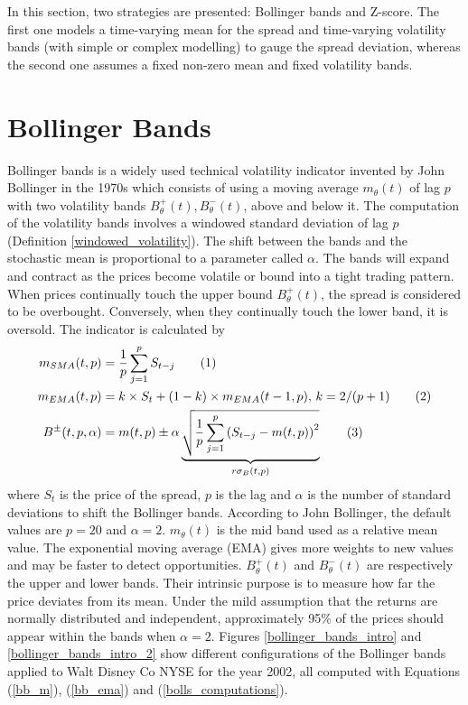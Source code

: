 \documentclass[11pt,a4,twosided,singlespacing,titlepagenumber=on]{scrreprt}
\numberwithin{equation}{chapter} %
\theoremstyle{remark}
\newcommand\numberthis{\addtocounter{equation}{1}\tag{\theequation}}
\begin{document}
In this section, two strategies are presented: Bollinger bands and Z-score. The first one models a time-varying mean for the spread and time-varying volatility bands (with simple or complex modelling) to gauge the spread deviation, whereas the second one assumes a fixed non-zero mean and fixed volatility bands.

\section{Bollinger Bands}
\label{sec:bollinger_bands}
Bollinger bands is a widely used technical volatility indicator invented by John Bollinger in the 1970s which consists of using a moving average $m_\theta(t)$ of lag $p$ with two volatility bands $B_\theta^+(t), B_\theta^-(t)$, above and below it. The computation of the volatility bands involves a windowed standard deviation of lag $p$ (Definition \ref{windowed_volatility}). The shift between the bands and the stochastic mean is proportional to a parameter called $\alpha$. The bands will expand and contract as the prices become volatile or bound into a tight trading pattern. When prices continually touch the upper bound $B_\theta^+(t)$, the spread is considered to be overbought. Conversely, when they continually touch the lower band, it is oversold. The indicator is calculated by
\begin{align*}
m_{SMA}(t,p) &= \frac{1}{p}\sum_{j=1}^p S_{t-j} \numberthis \label{bb_m} \\
m_{EMA}(t,p) &= k \times S_t + (1-k) \times m_{EMA}(t-1,p) \text{, } k = 2/(p+1) \numberthis \label{bb_ema} \\
B^\pm(t,p,\alpha) &= m(t,p) \pm \alpha \underbrace{\sqrt{\frac{1}{p} \sum_{j=1}^p \left(S_{t-j} - m(t,p) \right)^2}}_{r\sigma_B(t,p)} \numberthis \label{bolls_computations}
\end{align*}
where $S_t$ is the price of the spread, $p$ is the lag and $\alpha$ is the number of standard deviations to shift the Bollinger bands. According to John Bollinger, the default values are $p = 20$ and $\alpha = 2$. $m_\theta(t)$ is the mid band used as a relative mean value. The exponential moving average (EMA) gives more weights to new values and may be faster to detect opportunities. $B^+_\theta(t)$ and $B^-_\theta(t)$ are respectively the upper and lower bands. Their intrinsic purpose is to measure how far the price deviates from its mean. Under the mild assumption that the returns are normally distributed and independent, approximately 95\% of the prices should appear within the bands when $\alpha = 2$. Figures \ref{bollinger_bands_intro} and \ref{bollinger_bands_intro_2} show different configurations of the Bollinger bands applied to Walt Disney Co NYSE for the year 2002, all computed with Equations (\ref{bb_m}), (\ref{bb_ema}) and (\ref{bolls_computations}).
\end{document}
